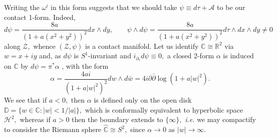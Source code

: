 \documentclass[a0paper,portrait]{baposter}
\theoremstyle{definition}
\newcommand{\ie}{\emph{i.e.} }
\newcommand{\al}{\alpha}
\newcommand{\w}{\omega}
\newcommand{\R}{\mathbb{R}}
\begin{document}
\begin{poster}
{Writing the $\w^{i}$ in this form suggests that we should take $\psi \equiv d\tau + \mathcal{A}$ to be our contact 1-form. Indeed,
\begin{equation*}
d\psi = \frac{8a}{(1+a(x^{2} + y^{2}))^{2}}dx\wedge dy,\qquad \psi\wedge d\psi = \frac{8a}{(1+a(x^{2} + y^{2}))^{2}}d\tau\wedge dx\wedge dy\neq 0
\end{equation*}
along $\mathcal{Z},$ whence $(\mathcal{Z},\psi)$ is a contact manifold. Let us identify $\mathbb{C}\cong\R^{2}$ via $w = x+iy$ and, as $d\psi$ is $S^{1}$-invariant and $i_{\partial_{\tau}}d\psi \equiv 0,$ a closed 2-form $\al$ is induced on $\mathbb{C}$ by $d\psi = \pi^{\ast}\al$ \cite{ding_2011}, with the form
\begin{equation*}
	\al = \frac{4ai}{(1+a|w|^{2})^{2}}dw\wedge d\bar{w} = 4i\partial\bar{\partial}\log(1+a|w|^{2}).
\end{equation*}
We see that if $a<0,$ then $\al$ is defined only on the open disk $\mathbb{D} = \{w\in\mathbb{C}: |w|<1/|a|\},$ which is conformally equivalent to hyperbolic space $\mathcal{H}^{2},$ whereas if $a>0$ then the boundary extends to $\{\infty\},$ \ie we may compactify to consider the Riemann sphere $\hat{\mathbb{C}} \cong S^{2},$ since $\al \rightarrow 0$ as $|w|\rightarrow \infty.$
}

\end{poster}
\end{document}
